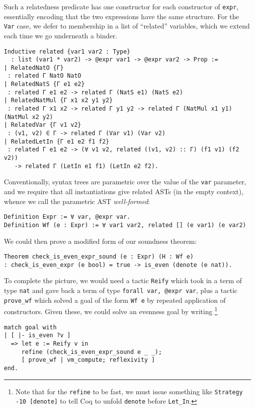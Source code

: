 Such a relatedness predicate has one constructor for each constructor of \texttt{expr}, essentially encoding that the two expressions have the same structure.
For the \texttt{Var} case, we defer to membership in a list of ``related'' variables, which we extend each time we go underneath a binder.
\begin{verbatim}
Inductive related {var1 var2 : Type}
  : list (var1 * var2) -> @expr var1 -> @expr var2 -> Prop :=
| RelatedNatO {Γ}
 : related Γ NatO NatO
| RelatedNatS {Γ e1 e2}
 : related Γ e1 e2 -> related Γ (NatS e1) (NatS e2)
| RelatedNatMul {Γ x1 x2 y1 y2}
 : related Γ x1 x2 -> related Γ y1 y2 -> related Γ (NatMul x1 y1) (NatMul x2 y2)
| RelatedVar {Γ v1 v2}
 : (v1, v2) ∈ Γ -> related Γ (Var v1) (Var v2)
| RelatedLetIn {Γ e1 e2 f1 f2}
 : related Γ e1 e2 -> (∀ v1 v2, related ((v1, v2) :: Γ) (f1 v1) (f2 v2))
   -> related Γ (LetIn e1 f1) (LetIn e2 f2).
\end{verbatim}

Conventionally, syntax trees are parametric over the value of the \texttt{var} parameter, and we require that all instantiations give related ASTs (in the empty context), whence we call the parametric AST \emph{well-formed}:
\begin{verbatim}
Definition Expr := ∀ var, @expr var.
Definition Wf (e : Expr) := ∀ var1 var2, related [] (e var1) (e var2)
\end{verbatim}

We could then prove a modified form of our soundness theorem:
\begin{verbatim}
Theorem check_is_even_expr_sound (e : Expr) (H : Wf e)
: check_is_even_expr (e bool) = true -> is_even (denote (e nat)).
\end{verbatim}

To complete the picture, we would need a tactic \texttt{Reify} which took in a term of type \texttt{nat} and gave back a term of type \texttt{forall var, @expr var}, plus a tactic \texttt{prove_wf} which solved a goal of the form \texttt{Wf e} by repeated application of constructors.
Given these, we could solve an evenness goal by writing%
\footnote{%
  Note that for the \texttt{refine} to be fast, we must issue something like \texttt{Strategy -10 [denote]} to tell Coq to unfold \texttt{denote} before \texttt{Let_In}.
  }
\begin{verbatim}
match goal with
| [ |- is_even ?v ]
  => let e := Reify v in
     refine (check_is_even_expr_sound e _ _);
     [ prove_wf | vm_compute; reflexivity ]
end.
\end{verbatim}

